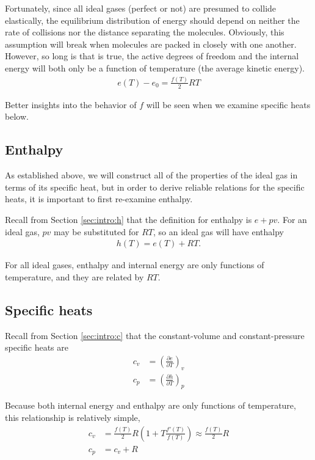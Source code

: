 Fortunately, since all ideal gases (perfect or not) are presumed to collide elastically, the equilibrium distribution of energy should depend on neither the rate of collisions nor the distance separating the molecules.  Obviously, this assumption will break when molecules are packed in closely with one another.  However, so long is that is true, the active degrees of freedom and the internal energy will both only be a function of temperature (the average kinetic energy).
\begin{align}
e(T) - e_0 = \frac{f(T)}{2} R T \label{eqn:ig:efromt}
\end{align}

Better insights into the behavior of $f$ will be seen when we examine specific heats below.

\subsection{Enthalpy}

As established above, we will construct all of the properties of the ideal gas in terms of its specific heat, but in order to derive reliable relations for the specific heats, it is important to first re-examine enthalpy.

Recall from Section \ref{sec:intro:h} that the definition for enthalpy is $e + pv$.  For an ideal gas, $pv$ may be substituted for $R T$, so an ideal gas will have enthalpy
\begin{align}
h(T) = e(T) + RT.\label{eqn:ig:hfrome}
\end{align}

For all ideal gases, enthalpy and internal energy are only functions of temperature, and they are related by $RT$.

\subsection{Specific heats}

Recall from Section \ref{sec:intro:c} that the constant-volume and constant-pressure specific heats are
\begin{align}
c_v &= \left( \frac{\partial e}{\partial T} \right)_v\nonumber\\
c_p &= \left( \frac{\partial h}{\partial T} \right)_p\nonumber
\end{align}

Because both internal energy and enthalpy are only functions of temperature, this relationship is relatively simple,
\begin{align}
c_v &= \frac{f(T)}{2} R \left( 1 + T\frac{f'(T)}{f(T)}\right) \approx \frac{f(T)}{2} R \label{eqn:ig:cvfromt}\\
c_p &= c_v + R
\end{align}

